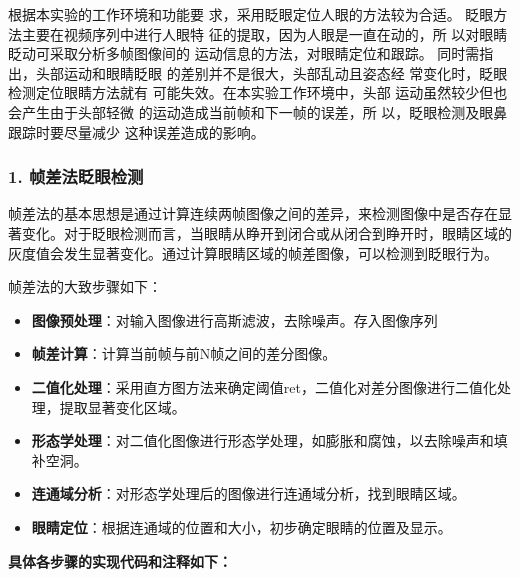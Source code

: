 \documentclass[12pt,hyperref,a4paper,UTF8]{ctexart}
\begin{document}
        根据本实验的工作环境和功能要
        求，采用眨眼定位人眼的方法较为合适。
        眨眼方法主要在视频序列中进行人眼特
        征的提取，因为人眼是一直在动的，所
        以对眼睛眨动可采取分析多帧图像间的
        运动信息的方法，对眼睛定位和跟踪。
        同时需指出，头部运动和眼睛眨眼
        的差别并不是很大，头部乱动且姿态经
        常变化时，眨眼检测定位眼睛方法就有
        可能失效。在本实验工作环境中，头部
        运动虽然较少但也会产生由于头部轻微
        的运动造成当前帧和下一帧的误差，所
        以，眨眼检测及眼鼻跟踪时要尽量减少
        这种误差造成的影响。


        \subsubsection*{\large \textbf{1. 帧差法眨眼检测}}
        帧差法的基本思想是通过计算连续两帧图像之间的差异，来检测图像中是否存在显著变化。对于眨眼检测而言，当眼睛从睁开到闭合或从闭合到睁开时，眼睛区域的灰度值会发生显著变化。通过计算眼睛区域的帧差图像，可以检测到眨眼行为。

        帧差法的大致步骤如下：

        \begin{itemize}
            \item \textbf{图像预处理}：对输入图像进行高斯滤波，去除噪声。存入图像序列
            \item \textbf{帧差计算}：计算当前帧与前N帧之间的差分图像。
            \item \textbf{二值化处理}：采用直方图方法来确定阈值ret，二值化对差分图像进行二值化处理，提取显著变化区域。
            \item \textbf{形态学处理}：对二值化图像进行形态学处理，如膨胀和腐蚀，以去除噪声和填补空洞。
            \item \textbf{连通域分析}：对形态学处理后的图像进行连通域分析，找到眼睛区域。
            \item \textbf{眼睛定位}：根据连通域的位置和大小，初步确定眼睛的位置及显示。
        \end{itemize}

        \textbf{具体各步骤的实现代码和注释如下：}
\end{document}
